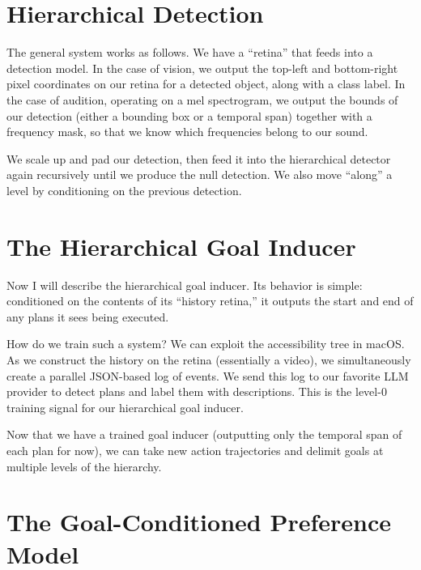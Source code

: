 \documentclass[12pt, a4paper]{article}
\begin{document}
\bigskip

\section{Hierarchical Detection}

The general system works as follows. We have a ``retina'' that feeds into a detection model. In the case of vision, we output the top-left and bottom-right pixel coordinates on our retina for a detected object, along with a class label. In the case of audition, operating on a mel spectrogram, we output the bounds of our detection (either a bounding box or a temporal span) together with a frequency mask, so that we know which frequencies belong to our sound.

We scale up and pad our detection, then feed it into the hierarchical detector again recursively until we produce the null detection. We also move ``along'' a level by conditioning on the previous detection.

\section{The Hierarchical Goal Inducer}

Now I will describe the hierarchical goal inducer. Its behavior is simple: conditioned on the contents of its ``history retina,'' it outputs the start and end of any plans it sees being executed.

How do we train such a system? We can exploit the accessibility tree in macOS. As we construct the history on the retina (essentially a video), we simultaneously create a parallel JSON-based log of events. We send this log to our favorite LLM provider to detect plans and label them with descriptions. This is the level-0 training signal for our hierarchical goal inducer.

Now that we have a trained goal inducer (outputting only the temporal span of each plan for now), we can take new action trajectories and delimit goals at multiple levels of the hierarchy.

\section{The Goal-Conditioned Preference Model}
\end{document}
